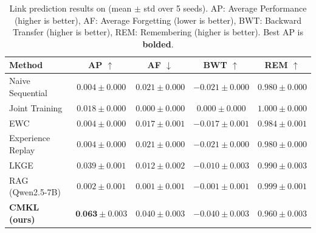 \begin{table}[t]
\centering
\caption{Link prediction results on \ours (mean $\pm$ std over 5 seeds). AP: Average Performance (higher is better), AF: Average Forgetting (lower is better), BWT: Backward Transfer (higher is better), REM: Remembering (higher is better). Best AP is \textbf{bolded}.}
\label{tab:main_results}
\small
\begin{tabular}{lcccc}
\toprule
\textbf{Method} & \textbf{AP} $\uparrow$ & \textbf{AF} $\downarrow$ & \textbf{BWT} $\uparrow$ & \textbf{REM} $\uparrow$ \\
\midrule
Naive Sequential & $0.004 \pm 0.000$ & $0.021 \pm 0.000$ & $-0.021 \pm 0.000$ & $0.980 \pm 0.000$ \\
Joint Training & $0.018 \pm 0.000$ & $0.000 \pm 0.000$ & $0.000 \pm 0.000$ & $1.000 \pm 0.000$ \\
EWC~\citep{Kirkpatrick2017} & $0.004 \pm 0.000$ & $0.017 \pm 0.001$ & $-0.017 \pm 0.001$ & $0.984 \pm 0.001$ \\
Experience Replay~\citep{Rolnick2019} & $0.004 \pm 0.000$ & $0.021 \pm 0.000$ & $-0.021 \pm 0.000$ & $0.980 \pm 0.000$ \\
LKGE~\citep{Cui2023} & $0.039 \pm 0.001$ & $0.012 \pm 0.002$ & $-0.010 \pm 0.003$ & $0.990 \pm 0.003$ \\
RAG (Qwen2.5-7B) & $0.002 \pm 0.001$ & $0.001 \pm 0.001$ & $-0.001 \pm 0.001$ & $0.999 \pm 0.001$ \\
\midrule
\textbf{CMKL (ours)} & $\textbf{0.063} \pm 0.003$ & $0.040 \pm 0.003$ & $-0.040 \pm 0.003$ & $0.960 \pm 0.003$ \\
\bottomrule
\end{tabular}
\end{table}
